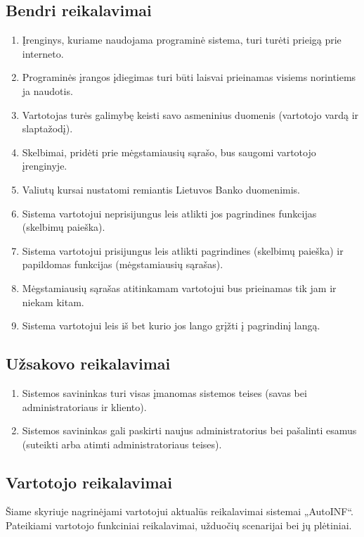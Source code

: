\documentclass[12pt]{article}
\renewcommand{\thesubsection}{FR\arabic{subsection}}
\renewcommand*{\theenumi}{\thesubsection.\arabic{enumi}}
\renewcommand*{\theenumii}{\thesubsubsection.\theenumi.\arabic{enumii}}
\begin{document}
	\subsection{Bendri reikalavimai}
	\begin{enumerate}[labelindent=10pt,leftmargin=2.2cm]
		\item Įrenginys, kuriame naudojama programinė sistema, turi turėti prieigą prie interneto.
		\item Programinės įrangos įdiegimas turi būti laisvai prieinamas visiems norintiems ja naudotis.
		\item Vartotojas turės galimybę keisti savo asmeninius duomenis (vartotojo vardą ir slaptažodį).
		\item Skelbimai, pridėti prie mėgstamiausių sąrašo, bus saugomi vartotojo įrenginyje.
		\item Valiutų kursai nustatomi remiantis Lietuvos Banko duomenimis.
		\item Sistema vartotojui neprisijungus leis atlikti jos pagrindines funkcijas (skelbimų paieška).
		\item Sistema vartotojui prisijungus leis atlikti pagrindines (skelbimų paieška) ir papildomas funkcijas (mėgstamiausių sąrašas).
		\item Mėgstamiausių sąrašas atitinkamam vartotojui bus prieinamas tik jam ir niekam kitam.
		\item Sistema vartotojui leis iš bet kurio jos lango grįžti į pagrindinį langą.
	\end{enumerate}
	
	\subsection{Užsakovo reikalavimai}
	\begin{enumerate}[labelindent=10pt,leftmargin=2.2cm]
		\item Sistemos savininkas turi visas įmanomas sistemos teises (savas bei administratoriaus ir kliento).
		\item Sistemos savininkas gali paskirti naujus administratorius bei pašalinti esamus (suteikti arba atimti administratoriaus teises).
	\end{enumerate}	
	\pagebreak
	
	\renewcommand*{\theenumi}{\thesubsubsection.\arabic{enumi}}
	\renewcommand*{\theenumii}{\thesubsubsection.\theenumi.\arabic{enumii}}
	\renewcommand*{\theenumiii}{\thesubsubsection.\theenumi.\theenumii.\arabic{enumiii}}
	\subsection{Vartotojo reikalavimai}\label{Vartotojo_reikalavimai}
	Šiame skyriuje nagrinėjami vartotojui aktualūs reikalavimai sistemai „AutoINF“. Pateikiami vartotojo funkciniai reikalavimai, užduočių scenarijai bei jų plėtiniai.
	
\end{document}
